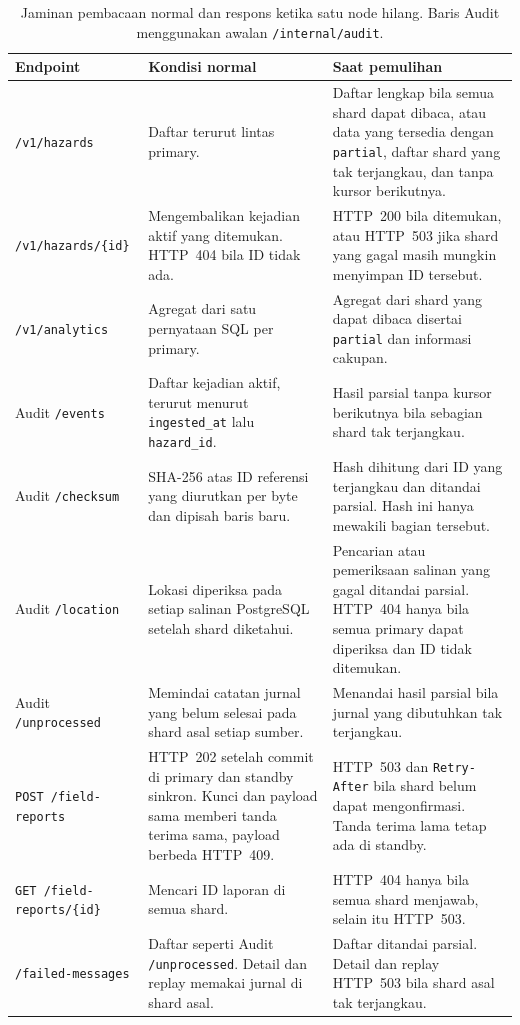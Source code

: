 \begin{table}[htbp]
\centering\small
\caption{Jaminan pembacaan normal dan respons ketika satu node hilang. Baris Audit menggunakan awalan \texttt{/internal/audit}.}
\label{tab:p1-consistency}
\begin{tabularx}{\linewidth}{@{}lYY@{}}
\toprule
Endpoint & Kondisi normal & Saat pemulihan \\
\midrule
\texttt{/v1/hazards} & Daftar terurut lintas primary. & Daftar lengkap bila semua shard dapat dibaca, atau data yang tersedia dengan \texttt{partial}, daftar shard yang tak terjangkau, dan tanpa kursor berikutnya. \\
\texttt{/v1/hazards/\{id\}} & Mengembalikan kejadian aktif yang ditemukan. HTTP~404 bila ID tidak ada. & HTTP~200 bila ditemukan, atau HTTP~503 jika shard yang gagal masih mungkin menyimpan ID tersebut. \\
\texttt{/v1/analytics} & Agregat dari satu pernyataan SQL per primary. & Agregat dari shard yang dapat dibaca disertai \texttt{partial} dan informasi cakupan. \\
Audit \texttt{/events} & Daftar kejadian aktif, terurut menurut \texttt{ingested\_at} lalu \texttt{hazard\_id}. & Hasil parsial tanpa kursor berikutnya bila sebagian shard tak terjangkau. \\
Audit \texttt{/checksum} & SHA-256 atas ID referensi yang diurutkan per byte dan dipisah baris baru. & Hash dihitung dari ID yang terjangkau dan ditandai parsial. Hash ini hanya mewakili bagian tersebut. \\
Audit \texttt{/location} & Lokasi diperiksa pada setiap salinan PostgreSQL setelah shard diketahui. & Pencarian atau pemeriksaan salinan yang gagal ditandai parsial. HTTP~404 hanya bila semua primary dapat diperiksa dan ID tidak ditemukan. \\
Audit \texttt{/unprocessed} & Memindai catatan jurnal yang belum selesai pada shard asal setiap sumber. & Menandai hasil parsial bila jurnal yang dibutuhkan tak terjangkau. \\
\texttt{POST /field-reports} & HTTP~202 setelah commit di primary dan standby sinkron. Kunci dan payload sama memberi tanda terima sama, payload berbeda HTTP~409. & HTTP~503 dan \texttt{Retry-After} bila shard belum dapat mengonfirmasi. Tanda terima lama tetap ada di standby. \\
\texttt{GET /field-reports/\{id\}} & Mencari ID laporan di semua shard. & HTTP~404 hanya bila semua shard menjawab, selain itu HTTP~503. \\
\texttt{/failed-messages} & Daftar seperti Audit \texttt{/unprocessed}. Detail dan replay memakai jurnal di shard asal. & Daftar ditandai parsial. Detail dan replay HTTP~503 bila shard asal tak terjangkau. \\
\bottomrule
\end{tabularx}
\end{table}

